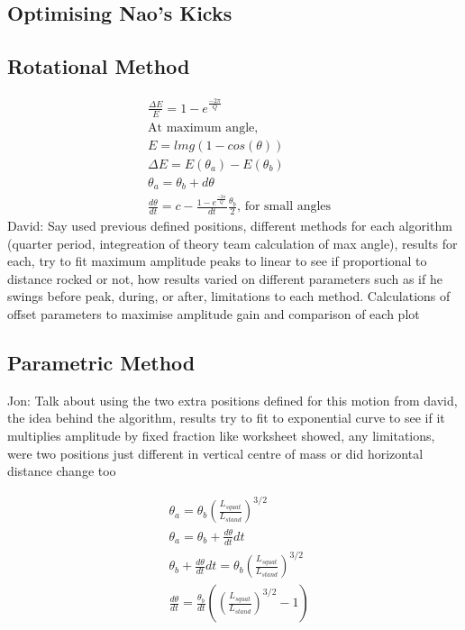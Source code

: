 \documentclass[11pt]{article}
\newcommand*\ruleline[1]{\par\noindent\raisebox{.8ex}{\makebox[\linewidth]{\hrulefill\hspace{1ex}\raisebox{-.8ex}{#1}\hspace{1ex}\hrulefill}}}
\begin{document}
\subsection{Optimising Nao's Kicks}
\ruleline{David Thomas}

\subsection{Rotational Method}
\ruleline{David Thomas}
\begin{align}
    &\frac{\Delta E}{E} = 1 - e^{\frac{-2\pi}{Q}}\\
    &\text{At maximum angle},\\
    &E = lmg(1-cos(\theta))\\
    &\Delta E = E(\theta_a) - E(\theta_b)\\
    &\theta_a = \theta_b + d\theta\\
    &\frac{d\theta}{dt} = c - \frac{1-e^{\frac{-2\pi}{Q}}}{dt}\frac{\theta_b}{2}, \, \text{for small angles}
\end{align}
David: Say used previous defined positions, different methods for each algorithm (quarter period, integreation of theory team calculation of max angle), results for each, try to fit maximum amplitude peaks to linear to see if proportional to distance rocked or not, how results varied on different parameters such as if he swings before peak, during, or after, limitations to each method.
Calculations of offset parameters to maximise amplitude gain and comparison of each plot

\subsection{Parametric Method}
Jon: Talk about using the two extra positions defined for this motion from david, the idea behind the algorithm, results try to fit to exponential curve to see if it multiplies amplitude by fixed fraction like worksheet showed, any limitations, were two positions just different in vertical centre of mass or did horizontal distance change too

\begin{align}
    &\theta_a = \theta_b (\frac{L_{squat}}{L_{stand}})^{3/2}\\
    &\theta_a = \theta_b + \frac{d\theta}{dt}dt\\
    &\theta_b + \frac{d\theta}{dt}dt = \theta_b (\frac{L_{squat}}{L_{stand}})^{3/2}\\
    &\frac{d\theta}{dt} = \frac{\theta_b}{dt} ((\frac{L_{squat}}{L_{stand}})^{3/2} - 1)\\ 
\end{align}
\end{document}

